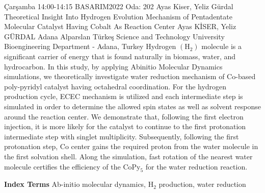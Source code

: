 
    \begin{abstract_basarim}
    {Çarşamba 14:00-14:15}
    {BASARIM2022}
    {Oda: 202}
    {Ayas Kiser, Yeliz Gürdal}
    {Theoretical Insight Into Hydrogen Evolution Mechanism of Pentadentate Molecular Catalyst Having Cobalt As Reaction Center}
    {%
    Ayas KİSER, Yeliz GÜRDAL}
    {%
    }
    {%
    Adana Alparslan Türkeş Science and Technology University Bioengineering Department - Adana, Turkey}
    Hydrogen $\left(\mathrm{H}_{2}\right)$ molecule is a significant carrier of energy that is found naturally in biomass, water, and hydrocarbon. In this study, by applying Abinitio Molecular Dynamics simulations, we theoretically investigate water reduction mechanism of Co-based poly-pyridyl catalyst having octahedral coordination. For the hydrogen production cycle, ECEC mechanism is utilized and each intermediate step is simulated in order to determine the allowed spin states as well as solvent response around the reaction center. We demonstrate that, following the first electron injection, it is more likely for the catalyst to continue to the first protonation intermediate step with singlet multiplicity. Subsequently, following the first protonation step, Co center gains the required proton from the water molecule in the first solvation shell. Along the simulation, fast rotation of the nearest water molecule certifies the efficiency of the $\mathrm{CoPy}_{5}$ for the water reduction reaction. 
    
            \textbf{Index Terms} \newline{}Ab-initio molecular dynamics, $\mathrm{H}_{2}$ production, water reduction
    \end{abstract_basarim}
    